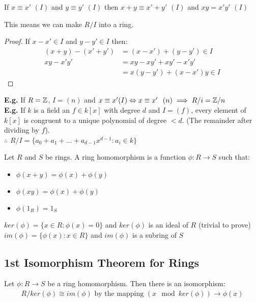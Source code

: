 \documentclass[11pt]{article}
\begin{document}
\begin{lemma}
	If $x \equiv x'$ $(I)$ and $y \equiv y'$ $(I)$ then $x+y  \equiv x'+y'$ $(I)$ and $xy = x'y'$ $(I)$
\end{lemma}
This means we can make $R/I$ into a ring.

\begin{proof}
If $x-x' \in I$ and $y-y' \in I$ then:
	\begin{align*}
		(x+y) - (x'+y')  &= (x-x') + (y-y') \in I \\[2em]
		xy - x'y' &= xy - xy' + xy' -x'y'\\
		&= x(y-y') + (x-x')y \in I
	\end{align*}
\end{proof}
$ $\\[-2em]
\textbf{E.g.} If $R = \mathbb{Z} $, $ I= (n) $ and  $x \equiv x' (I) \Leftrightarrow  x \equiv x' \hspace{7pt}(n) \implies R/i = \mathbb{Z}/n $ 
\\[1em]
\textbf{E.g.} If $k$ is a field an $f \in k[x]$ with degree $d$ and $I = (f)$, every element of $k[x]$ is congruent to a unique polynomial of degree $<d$. (The remainder after dividing by $f$).
$ $\\ 
$\therefore$  $R/I = \{ a_0 + a_1 + \dots + a_{d-1}x^{d-1} : a_i \in k \}$

\begin{defn}
Let $R$ and $S$ be rings. 
A ring homomorphism is a function $\phi : R \rightarrow S$ such that:
	\begin{itemize}
		\item{$\phi(x+y) = \phi(x) + \phi(y)$}
		\item{$\phi(xy) = \phi(x) + \phi(y)$}
		\item{$\phi(1_R) = 1_S$}
	\end{itemize}
	$ $\\
	$ker(\phi) = \{ x \in R : \phi (x) =0 \}$ and $ker(\phi)$ is an ideal of $R$ (trivial to prove) \\
	$im(\phi) = \{ \phi(x) : x \in R\}$ and $im(\phi)$ is a subring of $S$
\end{defn}


\subsection{1st Isomorphism Theorem for Rings}

Let $\phi : R \rightarrow S$ be a ring homomorphism. 
Then there is an isomorphism:
\begin{align*}
	R/ker(\phi) \cong im(\phi) \text{ by the mapping } (x\mod ker(\phi)) \rightarrow \phi(x)
\end{align*}
\end{document}
